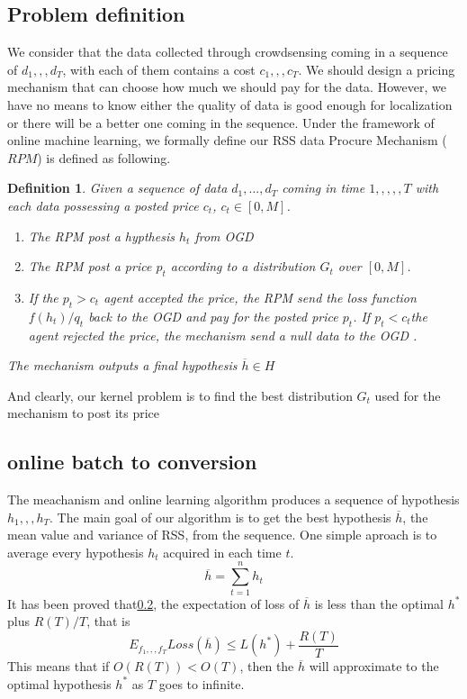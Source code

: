 \documentclass[10pt,conference,compsocconf,letterpaper]{IEEEtran}
\newtheorem{definition}{Definition}
\begin{document}
\subsection{Problem definition}
We consider that the data collected through crowdsensing coming in a sequence of $d_1,,,d_T$, with each of them contains a cost $c_1,,,c_T$. We should design a pricing mechanism that can choose how much we should pay for the data. However, we have no means to know either the quality of data is good enough for localization or there will be a better one coming in the sequence. Under the framework of online machine learning, we formally define our RSS data Procure Mechanism ($RPM$) is defined as following.
\begin{definition}{}\label{def:1}
Given a sequence of data ${d_1,...,d_T}$ coming in time $1,,,,,T$ with each data possessing a posted price $c_t$, $c_t\in [0,M]$. 
\begin{enumerate}
\item The RPM post a hypthesis $h_t$ from OGD
\item The RPM post a price $p_t$ according to a distribution $G_t$ over $[0,M]$.
\item If the $p_t>c_t$ agent accepted the price, the RPM send the loss function $f(h_t)/q_t$ back to the OGD and pay for the posted price $p_t$. If $p_t<c_t$the agent rejected the price, the mechanism send a null data to the OGD . 
\end{enumerate}
The mechanism outputs a final hypothesis $\overline{h}\in H$
\end{definition}
And clearly, our kernel problem is to find the best distribution $G_t$ used for the mechanism to post its price 
\subsection{online batch to conversion}
The meachanism and online learning algorithm produces a sequence of hypothesis $h_1,,,h_T$. The main goal of our algorithm is to get the best hypothesis $\overline{h}$, the mean value and variance of RSS, from the sequence. One simple aproach is to average every hypothesis $h_t$ acquired in each time $t$.
\begin{equation}
\overline{h}=\sum_{t=1}^n h_t
\end{equation}
It has been proved that\ref{}, the expectation of loss of $\overline{h}$ is less than the optimal $h^*$ plus $R(T)/T$, that is 
\begin{equation*}
E_{f_1,,,f_T}Loss(\overline{h})\leq L(h^*)+\frac{R(T)}{T}
\end{equation*}
This means that if $O(R(T))<O(T)$, then the $\overline{h}$ will approximate to the optimal hypothesis $h^*$ as $T$ goes to infinite.
\end{document}
